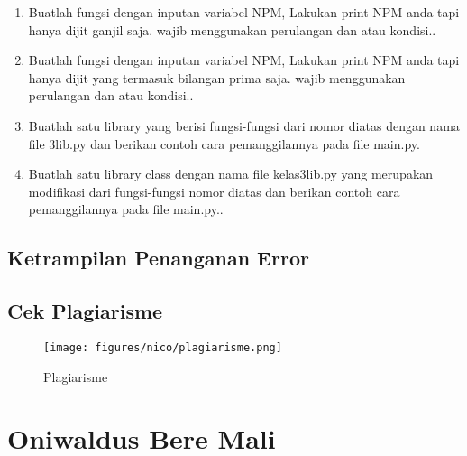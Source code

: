 \begin{enumerate}
	\item Buatlah fungsi dengan inputan variabel NPM, Lakukan print NPM anda tapi hanya dijit ganjil saja. wajib menggunakan perulangan dan atau kondisi..
	
	
	\item Buatlah fungsi dengan inputan variabel NPM, Lakukan print NPM anda tapi hanya dijit yang termasuk bilangan prima saja. wajib menggunakan perulangan dan atau kondisi..
	
	
	\item Buatlah satu library yang berisi fungsi-fungsi dari nomor diatas dengan nama file 3lib.py dan berikan contoh cara pemanggilannya pada file main.py.
	
	
	\item Buatlah satu library class dengan nama file kelas3lib.py yang merupakan modifikasi dari fungsi-fungsi nomor diatas dan berikan contoh cara pemanggilannya pada file main.py..
	
	
\end{enumerate}
\subsection{Ketrampilan Penanganan Error}


\subsection{Cek Plagiarisme}
\begin{figure}[!htbp]
	\centering
	\texttt{[image: figures/nico/plagiarisme.png]}
	\caption{Plagiarisme}
	\label{plagiarisme}
\end{figure}

\section{Oniwaldus Bere Mali}
